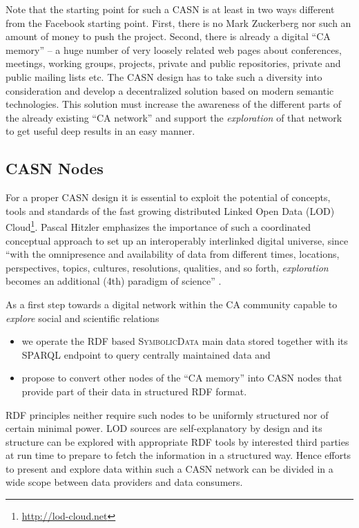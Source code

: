 \documentclass[a4paper,11pt]{article}
\def\SD{\textsc{SymbolicData}}
\begin{document}
Note that the starting point for such a CASN is  at least in two ways different
from the Facebook starting point. First, there is no Mark Zuckerberg nor such
an amount of money to push the project. Second, there is already a digital ``CA
memory'' -- a huge number of very loosely related web pages about conferences,
meetings, working groups, projects, private and public repositories, private
and public mailing lists etc. The CASN design has to take such a diversity into
consideration and develop a decentralized solution based on modern semantic
technologies. This solution must increase the awareness of the different parts of the
already existing ``CA network'' and support the \emph{exploration} of that
network to get useful deep results in an easy manner.

\subsection{CASN Nodes}

For a proper CASN design it is essential to exploit the potential of concepts,
tools and standards of the fast growing distributed Linked Open Data (LOD)
Cloud\footnote{ \url{http://lod-cloud.net}}.  Pascal Hitzler emphasizes the
importance of such a coordinated conceptual approach to set up an interoperably
interlinked digital universe, since ``with the omnipresence and availability of
data from different times, locations, perspectives, topics, cultures,
resolutions, qualities, and so forth, \emph{exploration} becomes an additional
(4th) paradigm of science'' \cite{hitzler-13}.

As a first step towards a digital network within the CA community capable
to \emph{explore} social and scientific relations
\begin{itemize}
\item we operate the RDF based {\SD} main data stored together with its SPARQL
  endpoint \cite{sdsparql} to query centrally maintained data and
\item propose to convert other nodes of the ``CA memory'' into CASN nodes that
  provide part of their data in structured RDF format.
\end{itemize}
RDF principles neither require such nodes to be uniformly structured nor of
certain minimal power. LOD sources are self-explanatory by design and its
structure can be explored with appropriate RDF tools by interested third
parties at run time to prepare to fetch the information in a structured way.
Hence efforts to present and explore data within such a CASN network can be
divided in a wide scope between data providers and data consumers. 
\end{document}
